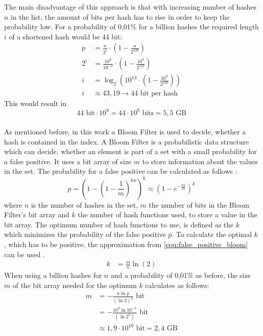 The main disadvantage of this approach is that with increasing number of hashes $n$ in the list, the amount of bits per hash has to rise in order to keep the probability low.
For a probability of 0,01\% for a billion hashes the required length $i$ of a shortened hash would be 44 bit:
\begin{equation}
	\begin{split}
		p&=\frac{n}{2^i}\cdot \left(1- \frac{n}{2^{128}}\right) \\[10pt]
		2^i&=\frac{10^9}{10^{-4}}\cdot \left(1- \frac{10^9}{2^{128}}\right) \\[10pt]
		i&=\log_2\left(10^{13}\cdot \left(1- \frac{10^9}{2^{128}}\right)\right) \\[10pt]
		i&\approx 43,19 \rightarrow 44 \text{ bit per hash}
	\end{split}
\end{equation}
This would result in 
\begin{equation}
	44\text{ bit} \cdot 10^9 = 44\cdot10^9 \text{ bits} = 5,5 \text{ GB}
\end{equation}
\\
As mentioned before, in this work a Bloom Filter is used to decide, whether a hash is contained in the index.
A Bloom Filter is a probabilistic data structure which can decide, whether an element is part of a set with a small probability for a false positive.
It uses a bit array of size $m$ to store information about the values in the set.
The probability for a false positive can be calculated as follows \cite{fan2000summary}:
\begin{equation}\label{equ:false_positive_bloom}
	p=\left(1-\left(1-\frac{1}{m}\right)^{kn}\right)^k \approx \left(1-e^{-\frac{kn}{m}}\right)^k
\end{equation}
where $n$ is the number of hashes in the set, $m$ the number of bits in the Bloom Filter's bit array and $k$ the number of hash functions used, to store a value in the bit array.
The optimum number of hash functions to use, is defined as the $k$ which minimizes the probability of the false positive $p$.
To calculate the optimal $k$, which has to be positive, the approximation from \autoref{equ:false_positive_bloom} can be used \cite{wiki2018bloom}.
\begin{equation}
	\begin{split}
		k&=\frac{m}{n}\ln(2)
	\end{split}
\end{equation}
When using a billion hashes for $n$ and a probability of 0,01\% as before, the size $m$ of the bit array needed for the optimum $k$ calculates as follows:
\begin{equation}
	\begin{split}
		m&=-\frac{n\ln p}{(\ln2)^2} \text{ bit} \\[10pt]
		&=-\frac{10^9\ln10^{-4}}{(\ln2^2)} \text{ bit} \\[10pt]
		&\approx 1,9\cdot10^{10} \text{ bit}=2,4\text{ GB}
	\end{split}
\end{equation}

